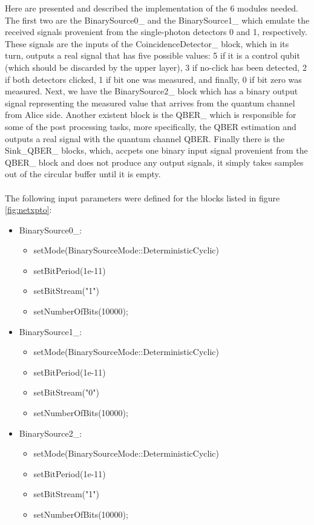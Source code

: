 \begin{refsection}
Here are presented and described the implementation of the 6 modules needed. The first two are the BinarySource0\_ and the BinarySource1\_ which emulate the received signals provenient from the single-photon detectors 0 and 1, respectively. These signals are the inputs of the CoincidenceDetector\_ block, which in its turn, outputs a real signal that has five possible values: 5 if it is a control qubit (which should be discarded by the upper layer), 3 if no-click has been detected, 2 if both detectors clicked, 1 if bit one was measured, and finally, 0 if bit zero was measured. Next, we have the BinarySource2\_ block which has a binary output signal representing the measured value that arrives from the quantum channel from Alice side. Another existent block is the QBER\_ which is responsible for some of the post processing tasks, more specifically, the QBER estimation and outputs a real signal with the quantum channel QBER. Finally there is the Sink\_QBER\_ blocks, which, accpets one binary input signal provenient from the QBER\_ block and does not produce any output signals, it simply takes samples out of the circular buffer until it is empty.\\ \\

The following input parameters were defined for the blocks listed in figure \ref{fig:netxpto}:

\begin{itemize}
	\item BinarySource0\_:
	\begin{itemize}
		\item setMode(BinarySourceMode::DeterministicCyclic)
		\item setBitPeriod(1e-11)
		\item setBitStream("1")
		\item setNumberOfBits(10000);
	\end{itemize}
	\clearpage
	\item BinarySource1\_:
	\begin{itemize}
		\item setMode(BinarySourceMode::DeterministicCyclic)
		\item setBitPeriod(1e-11)
		\item setBitStream("0")
		\item setNumberOfBits(10000);
	\end{itemize}
	
	\item BinarySource2\_:
	\begin{itemize}
		\item setMode(BinarySourceMode::DeterministicCyclic)
		\item setBitPeriod(1e-11)
		\item setBitStream("1")
		\item setNumberOfBits(10000);
	\end{itemize}
	

\end{itemize}
\end{refsection}

